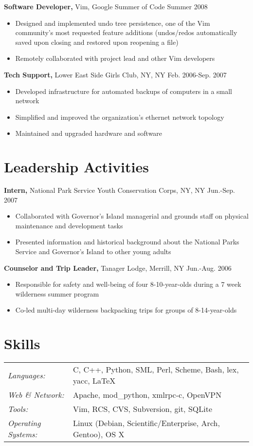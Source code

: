 \documentclass[line,overlapped]{res}
\begin{document}
\begin{resume}
{\bf Software Developer,} Vim, Google Summer of Code \hfill Summer 2008
\begin{itemize} \itemsep -2pt
    \item Designed and implemented undo tree persistence, one of the Vim community's most requested feature additions (undos/redos automatically saved upon closing and restored upon reopening a file)
    \item Remotely collaborated with project lead and other Vim developers
\end{itemize}

{\bf Tech Support,} Lower East Side Girls Club, NY, NY \hfill Feb. 2006-Sep. 2007
\begin{itemize} \itemsep -2pt
    \item Developed infrastructure for automated backups of computers in a small network
    \item Simplified and improved the organization's ethernet network topology
    \item Maintained and upgraded hardware and software
\end{itemize}
\section{Leadership Activities} 
{\bf Intern,} National Park Service Youth Conservation Corps, NY, NY \hfill Jun.-Sep. 2007
\begin{itemize} \itemsep -2pt
    \item Collaborated with Governor's Island managerial and grounds staff on physical maintenance and development tasks
    \item Presented information and historical background about the National Parks Service and Governor's Island to other young adults
\end{itemize}
{\bf Counselor and Trip Leader,} Tanager Lodge, Merrill, NY \hfill Jun.-Aug. 2006
\begin{itemize} \itemsep -2pt
    \item Responsible for safety and well-being of four 8-10-year-olds during a 7 week wilderness summer program
    \item Co-led multi-day wilderness backpacking trips for groups of 8-14-year-olds
\end{itemize}

\section{Skills}
   \begin{tabular}{l p{10in}}
   {\sl Languages:}&C, C++, Python, SML, Perl, Scheme, Bash, lex, yacc, \LaTeX\\
   {\sl Web \& Network:} & Apache, mod\_python, xmlrpc-c, OpenVPN\\
   {\sl Tools: } & Vim, RCS, CVS, Subversion, git, SQLite\\
   {\sl Operating Systems:} & Linux (Debian, Scientific/Enterprise, Arch, Gentoo), OS X\\
 \end{tabular}

\end{resume} 
\end{document}
